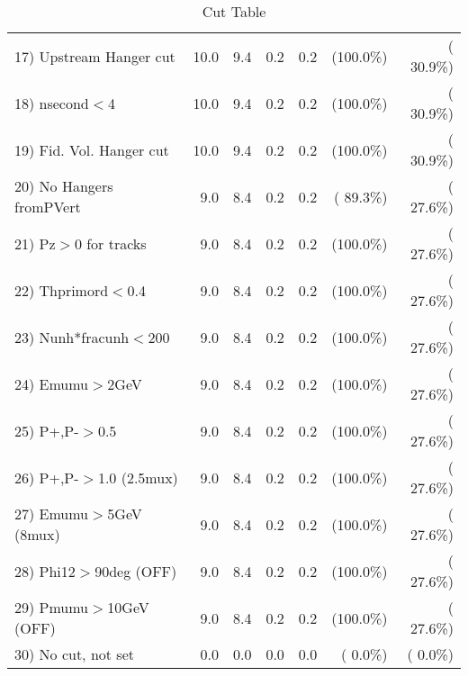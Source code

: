 \begin{table}[h!]
\begin{tabular}{||l||r|r|r|r|r|r||}
 17) Upstream Hanger cut  &         10.0 &          9.4 &          0.2 &          0.2 & (100.0\%) & ( 30.9\%) \\
 18) nsecond$<$4          &         10.0 &          9.4 &          0.2 &          0.2 & (100.0\%) & ( 30.9\%) \\
 19) Fid. Vol. Hanger cut &         10.0 &          9.4 &          0.2 &          0.2 & (100.0\%) & ( 30.9\%) \\
 20) No Hangers fromPVert &          9.0 &          8.4 &          0.2 &          0.2 & ( 89.3\%) & ( 27.6\%) \\
 21) Pz$>$0 for tracks    &          9.0 &          8.4 &          0.2 &          0.2 & (100.0\%) & ( 27.6\%) \\
 22) Thprimord$<$0.4      &          9.0 &          8.4 &          0.2 &          0.2 & (100.0\%) & ( 27.6\%) \\
 23) Nunh*fracunh$<$200   &          9.0 &          8.4 &          0.2 &          0.2 & (100.0\%) & ( 27.6\%) \\
 24) Emumu$>$2GeV         &          9.0 &          8.4 &          0.2 &          0.2 & (100.0\%) & ( 27.6\%) \\
 25) P+,P-$>$0.5          &          9.0 &          8.4 &          0.2 &          0.2 & (100.0\%) & ( 27.6\%) \\
 26) P+,P-$>$1.0 (2.5mux) &          9.0 &          8.4 &          0.2 &          0.2 & (100.0\%) & ( 27.6\%) \\
 27) Emumu$>$5GeV  (8mux) &          9.0 &          8.4 &          0.2 &          0.2 & (100.0\%) & ( 27.6\%) \\
 28) Phi12$>$90deg  (OFF) &          9.0 &          8.4 &          0.2 &          0.2 & (100.0\%) & ( 27.6\%) \\
 29) Pmumu$>$10GeV  (OFF) &          9.0 &          8.4 &          0.2 &          0.2 & (100.0\%) & ( 27.6\%) \\
 30) No cut, not set      &          0.0 &          0.0 &          0.0 &          0.0 & (  0.0\%) & (  0.0\%) \\
 \hline
 \hline
 \end{tabular}
 \caption{Cut Table           }
 \label{tab-cutheavy_neutrino_2.000}
 \end{table}
